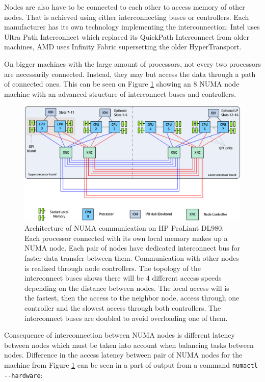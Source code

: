 Nodes are also have to be connected to each other to access memory of other
nodes. That is achieved using either interconnecting buses or controllers. Each
manufacturer has its own technology implementing the interconnection: Intel uses
Ultra Path Interconnect which replaced its QuickPath Interconnect from older
machines, AMD uses Infinity Fabric supersetting the older HyperTransport.

On bigger machines with the large amount of processors, not every two processors
are necessarily connected. Instead, they may but access the data through a path
of connected ones. This can be seen on Figure \ref{fig:proliant} showing an 8
NUMA node machine with an advanced structure of interconnect buses and
controllers.

\begin{figure}
  \centering
  \includegraphics[width=14cm]{obrazky-figures/proliant}
  \caption{Architecture of NUMA communication on HP ProLiant DL980. Each
    processor connected with its own local memory makes up a NUMA node. Each
    pair of nodes have dedicated interconnect bus for faster data transfer
    between them. Communication with other nodes is realized through node
    controllers. The topology of the interconnect buses shows there will be 4
    different access speeds depending on the distance between nodes. The local
    access will is the fastest, then the access to the neighbor node, access
    through one controller and the slowest access through both controllers. The
    interconnect buses are doubled to avoid overloading one of them.}
  \label{fig:proliant}
\end{figure}

Consequence of interconnection between NUMA nodes is different latency between
nodes which must be taken into account when balancing tasks between nodes.
Difference in the access latency between pair of NUMA nodes for the machine from
Figure \ref{fig:proliant} can be seen in a part of output from a command
\verb|numactl --hardware|:

